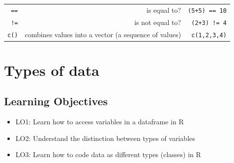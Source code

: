 \documentclass[]{book}
\providecommand{\tightlist}{%
  \setlength{\itemsep}{0pt}\setlength{\parskip}{0pt}}
\begin{document}
\begin{longtable}[]{@{}rrr@{}}
\begin{minipage}[t]{0.30\columnwidth}\raggedleft
\texttt{==}\strut
\end{minipage} & \begin{minipage}[t]{0.30\columnwidth}\raggedleft
is equal to?\strut
\end{minipage} & \begin{minipage}[t]{0.30\columnwidth}\raggedleft
\texttt{(5+5)\ ==\ 10}\strut
\end{minipage}\tabularnewline
\begin{minipage}[t]{0.30\columnwidth}\raggedleft
\texttt{!=}\strut
\end{minipage} & \begin{minipage}[t]{0.30\columnwidth}\raggedleft
is not equal to?\strut
\end{minipage} & \begin{minipage}[t]{0.30\columnwidth}\raggedleft
\texttt{(2+3)\ !=\ 4}\strut
\end{minipage}\tabularnewline
\begin{minipage}[t]{0.30\columnwidth}\raggedleft
\texttt{c()}\strut
\end{minipage} & \begin{minipage}[t]{0.30\columnwidth}\raggedleft
combines values into a vector (a sequence of values)\strut
\end{minipage} & \begin{minipage}[t]{0.30\columnwidth}\raggedleft
\texttt{c(1,2,3,4)}\strut
\end{minipage}\tabularnewline
\bottomrule
\end{longtable}

\hypertarget{chap-data-types}{%
\chapter{Types of data}\label{chap-data-types}}

\hypertarget{learning-objectives-1}{%
\section*{Learning Objectives}\label{learning-objectives-1}}

\begin{itemize}
\tightlist
\item
  LO1: Learn how to access variables in a dataframe in R\\
\item
  LO2: Understand the distinction between types of variables\\
\item
  LO3: Learn how to code data as different types (classes) in R
\end{itemize}
\end{document}
